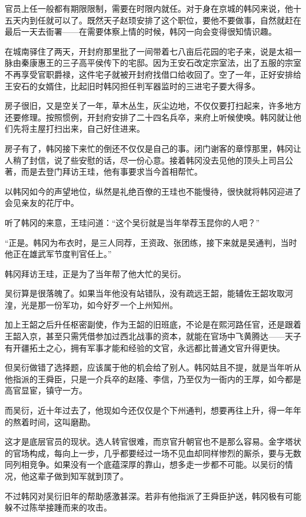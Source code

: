官员上任一般都有期限限制，需要在时限内就任。对于身在京城的韩冈来说，他十五天内到任就可以了。既然天子赵顼安排了这个职位，要他不要做事，自然就赶在最后一天去衙署——在需要体察上情的时候，韩冈一向会变得很知情识趣。

在城南驿住了两天，开封府那里批了一间带着七八亩后花园的宅子来，说是太祖一脉由秦康惠王的三子高平侯传下的宅邸。因为王安石改定宗室法，出了五服的宗室不再享受官职爵禄，这件宅子就被开封府找借口给收回了。空了一年，正好安排给王安石的女婿住，比起旧时韩冈担任判军器监时的三进宅子要大得多。

房子很旧，又是空关了一年，草木丛生，灰尘边地，不仅仅要打扫起来，许多地方还要修理。按照惯例，开封府安排了二十四名兵卒，来府上听候使唤。韩冈就让他们先将主屋打扫出来，自己好住进来。

房子有了，韩冈接下来忙的倒还不仅仅是自己的事。闭门谢客的章惇那里，韩冈让人稍了封信，说了些安慰的话，尽一份心意。接着韩冈没去见他的顶头上司吕公著，而是去登门拜访王珪，他有事要求当今首相帮忙。

以韩冈如今的声望地位，纵然是礼绝百僚的王珪也不能慢待，很快就将韩冈迎进了会见亲友的花厅中。

听了韩冈的来意，王珪问道：“这个吴衍就是当年举荐玉昆你的人吧？”

“正是。韩冈为布衣时，是三人同荐，王资政、张团练，接下来就是吴通判，当时他正在雄武军节度判官任上。”

韩冈拜访王珪，正是为了当年帮了他大忙的吴衍。

吴衍算是很落魄了。如果当年他没有站错队，没有疏远王韶，能辅佐王韶攻取河湟，光是那一份军功，如今好歹一个上州知州。

加上王韶之后升任枢密副使，作为王韶的旧班底，不论是在熙河路任官，还是跟着王韶入京，甚至只需凭借参加过西北战事的资本，就能在官场中飞黄腾达——天子有开疆拓土之心，拥有军事才能和经验的文官，永远都比普通文官升得更快。

但吴衍做错了选择题，应该属于他的机会给了别人。韩冈姑且不提，就是当年听从他指派的王舜臣，只是一介兵卒的赵隆、李信，乃至仅为一衙内的王厚，如今都是高官显宦，镇守一方。

而吴衍，近十年过去了，他现如今还仅仅是个下州通判，想要再往上升，得一年年的熬着时间，这叫磨勘。

这才是底层官员的现状。选人转官很难，而京官升朝官也不是那么容易。金字塔状的官场构成，每向上一步，几乎都要经过一场不见血却同样惨烈的厮杀，要与无数同列相竞争。如果没有一个底蕴深厚的靠山，想多走一步都不可能。以吴衍的情况，他这辈子做到知军就到顶了。

不过韩冈对吴衍旧年的帮助感激甚深。若非有他指派了王舜臣护送，韩冈极有可能躲不过陈举接踵而来的攻击。

